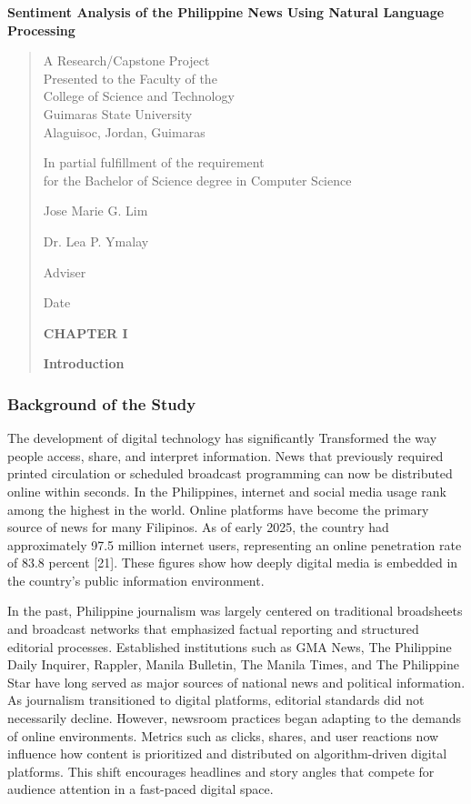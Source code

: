 \textbf{Sentiment Analysis of the Philippine News Using Natural Language Processing}

\begin{quote}
A Research/Capstone Project\\
Presented to the Faculty of the\\
College of Science and Technology\\
Guimaras State University\\
Alaguisoc, Jordan, Guimaras

In partial fulfillment of the requirement\\
for the Bachelor of Science degree in Computer Science

Jose Marie G. Lim

Dr. Lea P. Ymalay

Adviser

Date

\textbf{CHAPTER I}

\textbf{Introduction}
\end{quote}

\subsubsection{\texorpdfstring{\textbf{Background of the Study}}{Background of the Study}}\label{background-of-the-study}

The development of digital technology has significantly Transformed the way people access, share, and interpret information. News that previously required printed circulation or scheduled broadcast programming can now be distributed online within seconds. In the Philippines, internet and social media usage rank among the highest in the world. Online platforms have become the primary source of news for many Filipinos. As of early 2025, the country had approximately 97.5 million internet users, representing an online penetration rate of 83.8 percent {[}21{]}. These figures show how deeply digital media is embedded in the country's public information environment.

In the past, Philippine journalism was largely centered on traditional broadsheets and broadcast networks that emphasized factual reporting and structured editorial processes. Established institutions such as GMA News, The Philippine Daily Inquirer, Rappler, Manila Bulletin, The Manila Times, and The Philippine Star have long served as major sources of national news and political information. As journalism transitioned to digital platforms, editorial standards did not necessarily decline. However, newsroom practices began adapting to the demands of online environments. Metrics such as clicks, shares, and user reactions now influence how content is prioritized and distributed on algorithm-driven digital platforms. This shift encourages headlines and story angles that compete for audience attention in a fast-paced digital space.

